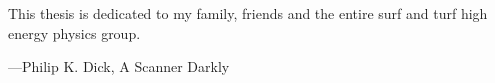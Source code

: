 \begin{frontmatter}
\makefrontmatter


\begin{dedication}                                                             
This thesis is dedicated to my family, friends and the entire surf and turf high energy physics group.
\end{dedication}                                                               
\clearpage 


\begin{myepigraph} %
  \vfil                                                                        
  \vfil 
\begin{centering}
\end{centering}
  \vfil 
  \vfil 
  \hfill ---Philip K. Dick, A Scanner Darkly
  \vfil 
\end{myepigraph}                                                               

\tableofcontents
\listoffigures  %
\listoftables   %


\end{frontmatter}
